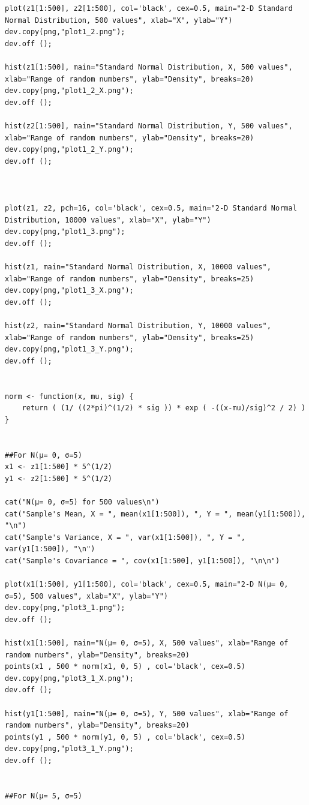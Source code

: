 \documentclass{article}
\begin{document}
\begin{lstlisting}
plot(z1[1:500], z2[1:500], col='black', cex=0.5, main="2-D Standard Normal Distribution, 500 values", xlab="X", ylab="Y")
dev.copy(png,"plot1_2.png");
dev.off ();

hist(z1[1:500], main="Standard Normal Distribution, X, 500 values", xlab="Range of random numbers", ylab="Density", breaks=20)
dev.copy(png,"plot1_2_X.png");
dev.off ();

hist(z2[1:500], main="Standard Normal Distribution, Y, 500 values", xlab="Range of random numbers", ylab="Density", breaks=20)
dev.copy(png,"plot1_2_Y.png");
dev.off ();



plot(z1, z2, pch=16, col='black', cex=0.5, main="2-D Standard Normal Distribution, 10000 values", xlab="X", ylab="Y")
dev.copy(png,"plot1_3.png");
dev.off ();

hist(z1, main="Standard Normal Distribution, X, 10000 values", xlab="Range of random numbers", ylab="Density", breaks=25)
dev.copy(png,"plot1_3_X.png");
dev.off ();

hist(z2, main="Standard Normal Distribution, Y, 10000 values", xlab="Range of random numbers", ylab="Density", breaks=25)
dev.copy(png,"plot1_3_Y.png");
dev.off ();


norm <- function(x, mu, sig) {
	return ( (1/ ((2*pi)^(1/2) * sig )) * exp ( -((x-mu)/sig)^2 / 2) )
}


##For N(μ= 0, σ=5)
x1 <- z1[1:500] * 5^(1/2)
y1 <- z2[1:500] * 5^(1/2)

cat("N(μ= 0, σ=5) for 500 values\n")
cat("Sample's Mean, X = ", mean(x1[1:500]), ", Y = ", mean(y1[1:500]), "\n")
cat("Sample's Variance, X = ", var(x1[1:500]), ", Y = ", var(y1[1:500]), "\n")
cat("Sample's Covariance = ", cov(x1[1:500], y1[1:500]), "\n\n")

plot(x1[1:500], y1[1:500], col='black', cex=0.5, main="2-D N(μ= 0, σ=5), 500 values", xlab="X", ylab="Y")
dev.copy(png,"plot3_1.png");
dev.off ();

hist(x1[1:500], main="N(μ= 0, σ=5), X, 500 values", xlab="Range of random numbers", ylab="Density", breaks=20)
points(x1 , 500 * norm(x1, 0, 5) , col='black', cex=0.5)
dev.copy(png,"plot3_1_X.png");
dev.off ();

hist(y1[1:500], main="N(μ= 0, σ=5), Y, 500 values", xlab="Range of random numbers", ylab="Density", breaks=20)
points(y1 , 500 * norm(y1, 0, 5) , col='black', cex=0.5)
dev.copy(png,"plot3_1_Y.png");
dev.off ();


##For N(μ= 5, σ=5)




\end{lstlisting}
\end{document}
